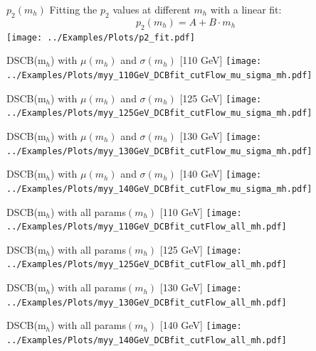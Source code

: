 \documentclass[10pt,UKenglish, leqno, xcolor = dvipsnames]{beamer}
\begin{document}
		\begin{frame}{$p_2(m_h)$}
			\vfill
			Fitting the $p_2$ values at different $m_h$ with a linear fit:
			$$
			p_2(m_h)=A+B\cdot m_h
			$$
			\centering
			\texttt{[image: ../Examples/Plots/p2\_fit.pdf]}
			\vfill
		\end{frame}
	
		\begin{frame}{DSCB(m$_{h}$) with $\mu(m_h)$ and $\sigma(m_h)$ [110 GeV]}
			\vfill
			\texttt{[image: ../Examples/Plots/myy\_110GeV\_DCBfit\_cutFlow\_mu\_sigma\_mh.pdf]}
			\vfill
		\end{frame}
	
		\begin{frame}{DSCB(m$_{h}$) with $\mu(m_h)$ and $\sigma(m_h)$ [125 GeV]}
			\vfill
			\texttt{[image: ../Examples/Plots/myy\_125GeV\_DCBfit\_cutFlow\_mu\_sigma\_mh.pdf]}
			\vfill
		\end{frame}

		\begin{frame}{DSCB(m$_{h}$) with $\mu(m_h)$ and $\sigma(m_h)$ [130 GeV]}
			\vfill
			\texttt{[image: ../Examples/Plots/myy\_130GeV\_DCBfit\_cutFlow\_mu\_sigma\_mh.pdf]}
			\vfill
		\end{frame}	
	
		\begin{frame}{DSCB(m$_{h}$) with $\mu(m_h)$ and $\sigma(m_h)$ [140 GeV]}
			\vfill
			\texttt{[image: ../Examples/Plots/myy\_140GeV\_DCBfit\_cutFlow\_mu\_sigma\_mh.pdf]}
			\vfill
		\end{frame}
	
		\begin{frame}{DSCB(m$_{h}$) with all params$(m_h)$ [110 GeV]}
			\vfill
			\texttt{[image: ../Examples/Plots/myy\_110GeV\_DCBfit\_cutFlow\_all\_mh.pdf]}
			\vfill
		\end{frame}
	
		\begin{frame}{DSCB(m$_{h}$) with all params$(m_h)$ [125 GeV]}
			\vfill
			\texttt{[image: ../Examples/Plots/myy\_125GeV\_DCBfit\_cutFlow\_all\_mh.pdf]}
			\vfill
		\end{frame}
	
		\begin{frame}{DSCB(m$_{h}$) with all params$(m_h)$ [130 GeV]}
			\vfill
			\texttt{[image: ../Examples/Plots/myy\_130GeV\_DCBfit\_cutFlow\_all\_mh.pdf]}
			\vfill
		\end{frame}
	
		\begin{frame}{DSCB(m$_{h}$) with all params$(m_h)$ [140 GeV]}
			\vfill
			\texttt{[image: ../Examples/Plots/myy\_140GeV\_DCBfit\_cutFlow\_all\_mh.pdf]}
			\vfill
		\end{frame}
	
\end{document}
